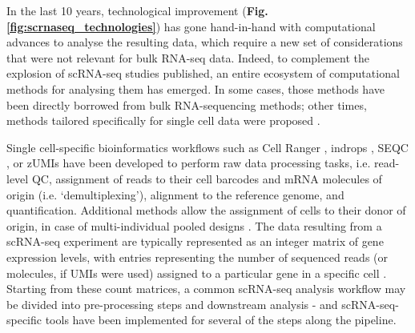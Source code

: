 In the last 10 years, technological improvement (\textbf{Fig. \ref{fig:scrnaseq_technologies}}) has gone hand-in-hand with computational advances to analyse the resulting data, which require a new set of considerations that were not relevant for bulk RNA-seq data.
Indeed, to complement the explosion of scRNA-seq studies published, an entire ecosystem of computational methods for analysing them has emerged.
In some cases, those methods have been directly borrowed from bulk RNA-sequencing methods; other times, methods tailored specifically for single cell data were proposed \cite{stegle2015computational, zappia2018exploring, luecken2019current}.

\clearpage

Single cell-specific bioinformatics workflows such as Cell Ranger \cite{zheng2017massively}, indrops \cite{klein2015droplet}, SEQC  \cite{azizi2018single}, or zUMIs \cite{parekh2018zumis} have been developed to perform raw data processing tasks, i.e. read-level QC, assignment of reads to their cell barcodes and mRNA molecules of origin (i.e. `demultiplexing'), alignment to the reference genome, and quantification. 
Additional methods allow the assignment of cells to their donor of origin, in case of  multi-individual pooled designs \cite{kang2018multiplexed, mccarthy2020cardelino}.
The data resulting from a scRNA-seq experiment are typically represented as an integer matrix of gene expression levels, with entries representing the number of sequenced reads (or molecules, if UMIs were used) assigned to a particular gene in a specific cell \cite{griffiths2018using}.
Starting from these count matrices, a common scRNA-seq analysis workflow may be divided into pre-processing steps and downstream analysis \cite{luecken2019current} - and scRNA-seq-specific tools have been implemented for several of the steps along the pipeline.\\

